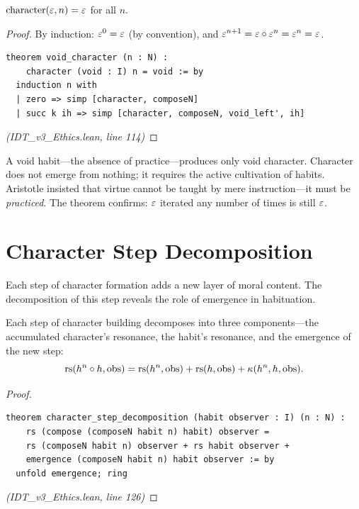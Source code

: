 \begin{theorem}
\label{thm:void-character}
$\mathrm{character}(\varepsilon, n) = \varepsilon$ for all $n$.
\end{theorem}

\begin{proof}
By induction: $\varepsilon^0 = \varepsilon$ (by convention), and $\varepsilon^{n+1} = \varepsilon \circ \varepsilon^n = \varepsilon^n = \varepsilon$.
\begin{lstlisting}
theorem void_character (n : N) :
    character (void : I) n = void := by
  induction n with
  | zero => simp [character, composeN]
  | succ k ih => simp [character, composeN, void_left', ih]
\end{lstlisting}
\textit{(IDT\_v3\_Ethics.lean, line 114)}
\end{proof}

\begin{interpretation}
A void habit---the absence of practice---produces only void character. Character
does not emerge from nothing; it requires the active cultivation of habits.
Aristotle insisted that virtue cannot be taught by mere instruction---it must
be \emph{practiced}. The theorem confirms: $\varepsilon$ iterated any number of times
is still $\varepsilon$.
\end{interpretation}

\section{Character Step Decomposition}
\label{sec:character-step}

Each step of character formation adds a new layer of moral content. The
decomposition of this step reveals the role of emergence in habituation.

\begin{theorem}
\label{thm:character-step}
Each step of character building decomposes into three components---the
accumulated character's resonance, the habit's resonance, and the emergence
of the new step:
\[
  \mathrm{rs}(h^n \circ h, \mathrm{obs}) = \mathrm{rs}(h^n, \mathrm{obs}) + \mathrm{rs}(h, \mathrm{obs})
  + \kappa(h^n, h, \mathrm{obs}).
\]
\end{theorem}

\begin{proof}
\begin{lstlisting}
theorem character_step_decomposition (habit observer : I) (n : N) :
    rs (compose (composeN habit n) habit) observer =
    rs (composeN habit n) observer + rs habit observer +
    emergence (composeN habit n) habit observer := by
  unfold emergence; ring
\end{lstlisting}
\textit{(IDT\_v3\_Ethics.lean, line 126)}
\end{proof}

